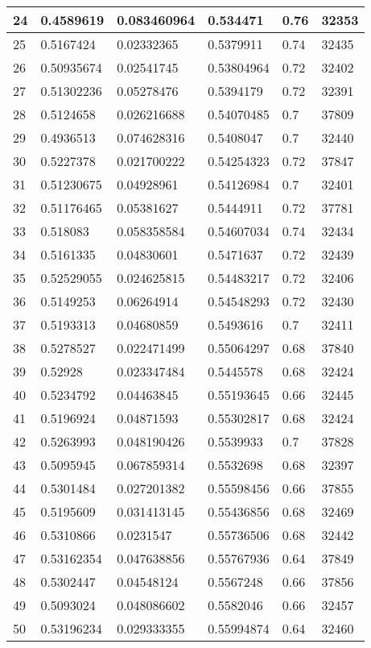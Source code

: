\begin{longtable}{|l|l|l|l|l|l|}
24 & 0.4589619 & 0.083460964 & 0.534471 & 0.76 & 32353 \\ \hline 
25 & 0.5167424 & 0.02332365 & 0.5379911 & 0.74 & 32435 \\ \hline 
26 & 0.50935674 & 0.02541745 & 0.53804964 & 0.72 & 32402 \\ \hline 
27 & 0.51302236 & 0.05278476 & 0.5394179 & 0.72 & 32391 \\ \hline 
28 & 0.5124658 & 0.026216688 & 0.54070485 & 0.7 & 37809 \\ \hline 
29 & 0.4936513 & 0.074628316 & 0.5408047 & 0.7 & 32440 \\ \hline 
30 & 0.5227378 & 0.021700222 & 0.54254323 & 0.72 & 37847 \\ \hline 
31 & 0.51230675 & 0.04928961 & 0.54126984 & 0.7 & 32401 \\ \hline 
32 & 0.51176465 & 0.05381627 & 0.5444911 & 0.72 & 37781 \\ \hline 
33 & 0.518083 & 0.058358584 & 0.54607034 & 0.74 & 32434 \\ \hline 
34 & 0.5161335 & 0.04830601 & 0.5471637 & 0.72 & 32439 \\ \hline 
35 & 0.52529055 & 0.024625815 & 0.54483217 & 0.72 & 32406 \\ \hline 
36 & 0.5149253 & 0.06264914 & 0.54548293 & 0.72 & 32430 \\ \hline 
37 & 0.5193313 & 0.04680859 & 0.5493616 & 0.7 & 32411 \\ \hline 
38 & 0.5278527 & 0.022471499 & 0.55064297 & 0.68 & 37840 \\ \hline 
39 & 0.52928 & 0.023347484 & 0.5445578 & 0.68 & 32424 \\ \hline 
40 & 0.5234792 & 0.04463845 & 0.55193645 & 0.66 & 32445 \\ \hline 
41 & 0.5196924 & 0.04871593 & 0.55302817 & 0.68 & 32424 \\ \hline 
42 & 0.5263993 & 0.048190426 & 0.5539933 & 0.7 & 37828 \\ \hline 
43 & 0.5095945 & 0.067859314 & 0.5532698 & 0.68 & 32397 \\ \hline 
44 & 0.5301484 & 0.027201382 & 0.55598456 & 0.66 & 37855 \\ \hline 
45 & 0.5195609 & 0.031413145 & 0.55436856 & 0.68 & 32469 \\ \hline 
46 & 0.5310866 & 0.0231547 & 0.55736506 & 0.68 & 32442 \\ \hline 
47 & 0.53162354 & 0.047638856 & 0.55767936 & 0.64 & 37849 \\ \hline 
48 & 0.5302447 & 0.04548124 & 0.5567248 & 0.66 & 37856 \\ \hline 
49 & 0.5093024 & 0.048086602 & 0.5582046 & 0.66 & 32457 \\ \hline 
50 & 0.53196234 & 0.029333355 & 0.55994874 & 0.64 & 32460 \\ \hline 
\end{longtable}